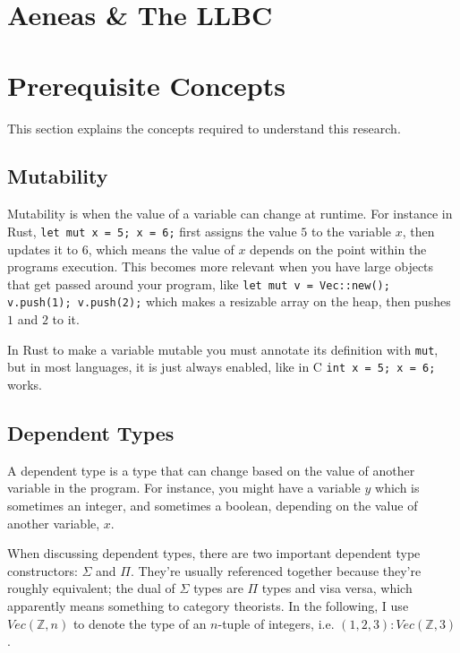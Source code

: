 \documentclass[12pt,twoside]{report}
\begin{document}
\section{Aeneas \& The LLBC}

\section{Prerequisite Concepts}
\label{prerequisites}
This section explains the concepts required to understand this research.

\subsection{Mutability}
Mutability is when the value of a variable can change at runtime. For instance in Rust, \verb|let mut x = 5; x = 6;| first assigns the value $5$ to the variable $x$, then updates it to $6$, which means the value of $x$ depends on the point within the programs execution. This becomes more relevant when you have large objects that get passed around your program, like \verb|let mut v = Vec::new(); v.push(1); v.push(2);| which makes a resizable array on the heap, then pushes $1$ and $2$ to it.

In Rust to make a variable mutable you must annotate its definition with \verb|mut|, but in most languages, it is just always enabled, like in C \verb|int x = 5; x = 6;| works.

\subsection{Dependent Types}
A dependent type is a type that can change based on the value of another variable in the program. For instance, you might have a variable $y$ which is sometimes an integer, and sometimes a boolean, depending on the value of another variable, $x$.

When discussing dependent types, there are two important dependent type constructors: $\Sigma$ and $\Pi$. They're usually referenced together because they're roughly equivalent; the dual of $\Sigma$ types are $\Pi$ types and visa versa, which apparently means something to category theorists. In the following, I use $Vec(\mathbb{Z}, n)$ to denote the type of an $n$-tuple of integers, i.e. $(1, 2, 3): Vec(\mathbb{Z}, 3)$.
\end{document}
